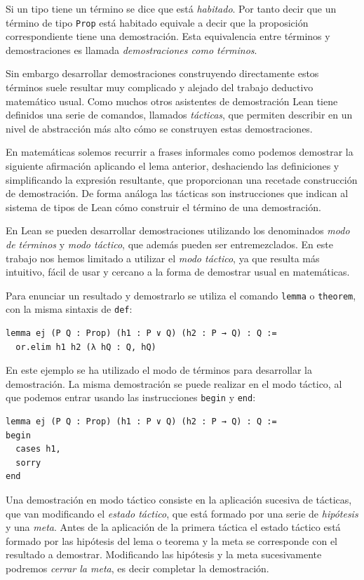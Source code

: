 Si un tipo tiene un término se dice que está \textit{habitado}. Por tanto decir
que un término de tipo \lstinline{Prop} está habitado equivale a decir que la
proposición correspondiente tiene una demostración. Esta equivalencia entre
términos y demostraciones es llamada \textit{demostraciones como términos}.

Sin embargo desarrollar demostraciones construyendo directamente estos términos
suele resultar muy complicado y alejado del trabajo deductivo matemático usual.
Como muchos otros asistentes de demostración Lean tiene definidos una
serie de comandos, llamados \textit{tácticas}, que permiten describir en un
nivel de abstracción más alto cómo se construyen estas demostraciones.

En matemáticas solemos recurrir a frases informales como \guillemotleft podemos
demostrar la siguiente afirmación aplicando el lema anterior, deshaciendo las
definiciones y simplificando la expresión resultante\guillemotright, que
proporcionan una \guillemotleft receta\guillemotright de construcción de
demostración. De forma análoga las tácticas son instrucciones que indican al
sistema de tipos de Lean cómo construir el término de una demostración.

En Lean se pueden desarrollar demostraciones utilizando los denominados
\textit{modo de términos} y \textit{modo táctico}, que además pueden ser
entremezclados. En este trabajo nos hemos limitado a utilizar el  \textit{modo
	táctico}, ya que resulta más intuitivo, fácil de usar y cercano a la forma de
demostrar usual en matemáticas.

Para enunciar un resultado y demostrarlo se utiliza el comando \lstinline{lemma}
o \lstinline{theorem}, con la misma sintaxis de \lstinline{def}:

\begin{lstlisting}
lemma ej (P Q : Prop) (h1 : P ∨ Q) (h2 : P → Q) : Q :=
  or.elim h1 h2 (λ hQ : Q, hQ)
\end{lstlisting}

En este ejemplo se ha utilizado el modo de términos para desarrollar la
demostración. La misma demostración se puede realizar en el modo táctico, al que
podemos entrar usando las instrucciones \lstinline{begin} y \lstinline{end}:

\begin{lstlisting}
lemma ej (P Q : Prop) (h1 : P ∨ Q) (h2 : P → Q) : Q :=
begin
  cases h1,
  sorry
end
\end{lstlisting}

Una demostración en modo táctico consiste en la aplicación sucesiva de tácticas,
que van modificando el \textit{estado táctico}, que está formado por una serie
de \textit{hipótesis} y una \textit{meta}. Antes de la aplicación de la primera
táctica el estado táctico está formado por las hipótesis del lema o teorema y la
meta se corresponde con el resultado a demostrar. Modificando las hipótesis y la
meta sucesivamente podremos \textit{cerrar la meta}, es decir completar la
demostración.

